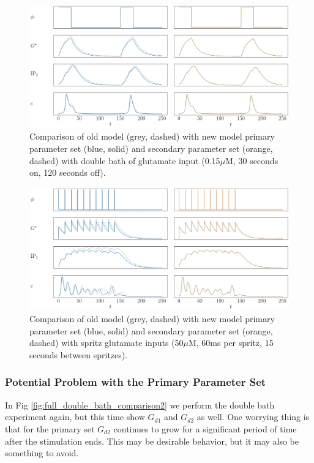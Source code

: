 \documentclass[12pt]{article}
\begin{document}
\begin{figure}[H]
	\includegraphics[width=1\linewidth]{figures/full_double_bath_comparison.png}
	\centering
	\caption{Comparison of old model (grey, dashed) with new model primary parameter set (blue, solid) and secondary parameter set (orange, dashed) with double bath of glutamate input (0.15$\mu$M, 30 seconds on, 120 seconds off).}
	\label{fig:full_double_bath_comparison}
\end{figure}

\begin{figure}[H]
	\includegraphics[width=1\linewidth]{figures/full_spritz_comparison.png}
	\centering
	\caption{Comparison of old model (grey, dashed) with new model primary parameter set (blue, solid) and secondary parameter set (orange, dashed) with spritz glutamate inputs (50$\mu$M, 60ms per spritz, 15 seconds between spritzes).}
	\label{fig:full_spritz_comparison}
\end{figure}


\subsubsection{Potential Problem with the Primary Parameter  Set}
In Fig \ref{fig:full_double_bath_comparison2} we perform the double bath experiment again, but this time show $G_{d1}$ and $G_{d2}$ as well. One worrying thing is that for the primary set $G_{d2}$ continues to grow for a significant period of time after the stimulation ends. This may be desirable behavior, but it may also be something to avoid.
\end{document}

